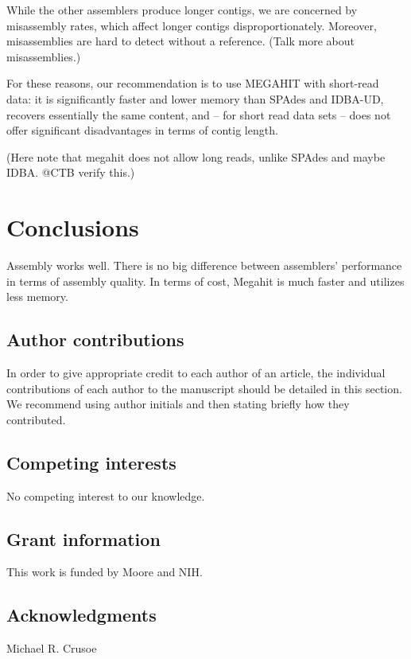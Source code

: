 \documentclass[10pt,a4paper,twocolumn]{article}
\begin{document}
While the other assemblers produce longer contigs, we are concerned by
misassembly rates, which affect longer contigs disproportionately.
Moreover, misassemblies are hard to detect without a reference. 
(Talk
more about misassemblies.)

For these reasons, our recommendation is to use MEGAHIT with
short-read data: it is significantly faster and lower memory than
SPAdes and IDBA-UD, recovers essentially the same content, and -- for
short read data sets -- does not offer significant disadvantages in
terms of contig length.

(Here note that megahit does not allow long reads, unlike SPAdes and maybe
IDBA. @CTB verify this.)

\section*{Conclusions}

Assembly works well. There is no big difference between assemblers'
performance in terms of assembly quality. In terms of cost, Megahit is
much faster and utilizes less memory.



\subsection*{Author contributions}
In order to give appropriate credit to each author of an article, the
individual contributions of each author to the manuscript should be
detailed in this section. We recommend using author initials and then
stating briefly how they contributed.

\subsection*{Competing interests}
No competing interest to our knowledge.

\subsection*{Grant information}
This work is funded by Moore and NIH.

\subsection*{Acknowledgments}
Michael R. Crusoe
\end{document}
